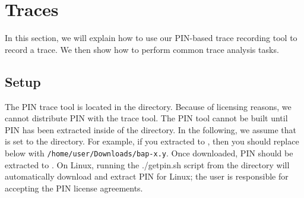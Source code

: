 \section{Traces}

In this section, we will explain how to use our PIN-based trace
recording tool to record a trace.  We then show how to perform common
trace analysis tasks.

\subsection{Setup}

The PIN trace tool is located in the  directory.
Because of licensing reasons, we cannot distribute PIN with the trace
tool.  The PIN tool cannot be built until PIN has been extracted
inside of the \bap directory.  In the following, we assume that
 is set to the \bap directory. For example, if you
extracted \bap to , then you should
replace  below with
\texttt{/home/user/Downloads/bap-x.y}. Once downloaded, PIN should be
extracted to .  On Linux, running the
./getpin.sh script from the 
directory will automatically download and extract PIN for Linux; the
user is responsible for accepting the PIN license agreements.

